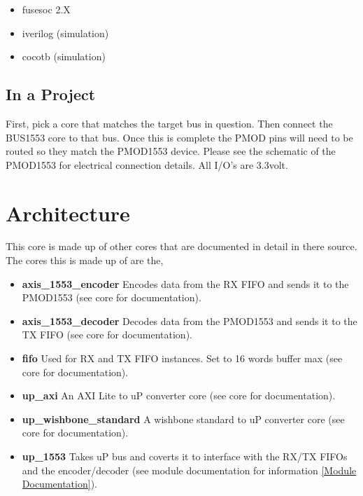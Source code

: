 \begin{itemize}
  \item fusesoc 2.X
  \item iverilog (simulation)
  \item cocotb (simulation)
\end{itemize}







\subsection{In a Project}
\par
First, pick a core that matches the target bus in question. Then connect the BUS1553 core to that bus. Once this is complete the PMOD pins will need
to be routed so they match the PMOD1553 device. Please see the schematic of the PMOD1553 for electrical connection details. All I/O's are 3.3volt.

\section{Architecture}
\par
This core is made up of other cores that are documented in detail in there source. The cores this is made up of are the,
\begin{itemize}
  \item \textbf{axis\_1553\_encoder} Encodes data from the RX FIFO and sends it to the PMOD1553 (see core for documentation).
  \item \textbf{axis\_1553\_decoder} Decodes data from the PMOD1553 and sends it to the TX FIFO (see core for documentation).
  \item \textbf{fifo} Used for RX and TX FIFO instances. Set to 16 words buffer max (see core for documentation).
  \item \textbf{up\_axi} An AXI Lite to uP converter core (see core for documentation).
  \item \textbf{up\_wishbone\_standard} A wishbone standard to uP converter core (see core for documentation).
  \item \textbf{up\_1553} Takes uP bus and coverts it to interface with the RX/TX FIFOs and the encoder/decoder (see module documentation for information \ref{Module Documentation}).
\end{itemize}

